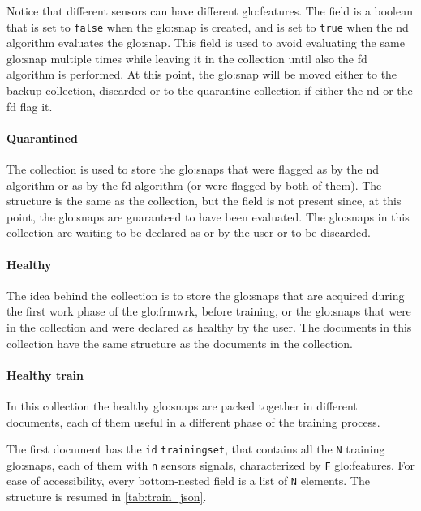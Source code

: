 Notice that different sensors can have different \gls{glo:feature}s. The  field is a boolean that is set to \texttt{false} when the \gls{glo:snap} is created, and is set to \texttt{true} when the \gls{nd} algorithm evaluates the \gls{glo:snap}. This field is used to avoid evaluating the same \gls{glo:snap} multiple times while leaving it in the collection until also the \gls{fd} algorithm is performed. At this point, the \gls{glo:snap} will be moved either to the backup collection, discarded or to the quarantine collection if either the \gls{nd} or the \gls{fd} flag it.

\paragraph{Quarantined}
The  collection is used to store the \gls{glo:snap}s that were flagged as  by the \gls{nd} algorithm or as  by the \gls{fd} algorithm (or were flagged by both of them). The structure is the same as the  collection, but the  field is not present since, at this point, the \gls{glo:snap}s are guaranteed to have been evaluated. The \gls{glo:snap}s in this collection are waiting to be declared as  or  by the user or to be discarded.

\paragraph{Healthy}
The idea behind the  collection is to store the \gls{glo:snap}s that are acquired during the first work phase of the \gls{glo:frmwrk}, before training, or the \gls{glo:snap}s that were in the  collection and were declared as healthy by the user. The documents in this collection have the same structure as the documents in the  collection.

\paragraph{Healthy train}
In this collection the healthy \gls{glo:snap}s are packed together in different documents, each of them useful in a different phase of the training process.

{The first document has the \texttt{id} \texttt{training\textunderscore set}, that contains all the \texttt{N} training \gls{glo:snap}s, each of them with \texttt{n} sensors signals, characterized by \texttt{F} \gls{glo:feature}s. For ease of accessibility, every bottom-nested field is a list of \texttt{N} elements. The structure is resumed in \autoref{tab:train_json}.}


